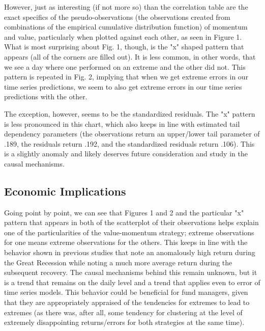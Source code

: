 \documentclass[11pt,letterpaper]{memoir}
\begin{document}
However, just as interesting (if not more so) than the correlation table are the exact specifics of the pseudo-observations (the observations created from combinations of the empirical cumulative distribution function) of momentum and value, particularly when plotted against each other, as seen in Figure 1. What is most surprising about Fig. 1, though, is the "x" shaped pattern that appears (all of the corners are filled out). It is less common, in other words, that we see a day where one performed on an extreme and the other did not. This pattern is repeated in Fig. 2, implying that when we get extreme errors in our time series predictions, we seem to also get extreme errors in our time series predictions with the other.

The exception, however, seems to be the standardized residuals. The "x" pattern is less pronounced in this chart, which also keeps in line with estimated tail dependency parameters (the observations return an upper/lower tail parameter of .189, the residuals return .192, and the standardized residuals return .106). This is a slightly anomaly and likely deserves future consideration and study in the causal mechanisms.

\subsection*{Economic Implications}
Going point by point, we can see that Figures 1 and 2 and the particular "x" pattern that appears in both of the scatterplot of their observations helps explain one of the particularities of the value-momentum strategy; extreme observations for one means extreme observations for the others. This keeps in line with the behavior shown in previous studies that note an anomalously high return during the Great Recession while noting a much more average return during the subsequent recovery. The causal mechanisms behind this remain unknown, but it is a trend that remains on the daily level and a trend that applies even to error of time series models. This behavior could be beneficial for fund managers, given that they are appropriately appraised of the tendencies for extremes to lead to extremes (as there was, after all, some tendency for clustering at the level of extremely disappointing returns/errors for both strategies at the same time).
\end{document}
